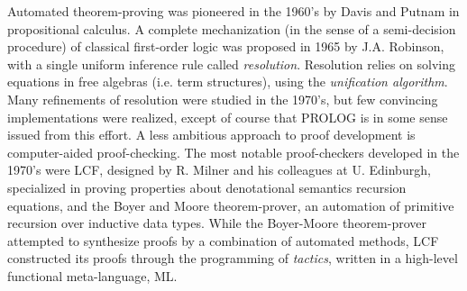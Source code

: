 Automated theorem-proving was pioneered in the 1960's by Davis and
Putnam in propositional calculus.  A complete mechanization (in the
sense of a semi-decision procedure) of classical first-order logic was
proposed in 1965 by J.A. Robinson, with a single uniform inference
rule called \emph{resolution}. Resolution relies on solving equations
in free algebras (i.e. term structures), using the \emph{unification
  algorithm}. Many refinements of resolution were studied in the
1970's, but few convincing implementations were realized, except of
course that PROLOG is in some sense issued from this effort.  A less
ambitious approach to proof development is computer-aided
proof-checking.  The most notable proof-checkers developed in the
1970's were LCF, designed by R. Milner and his colleagues at U.
Edinburgh, specialized in proving properties about denotational
semantics recursion equations, and the Boyer and Moore theorem-prover,
an automation of primitive recursion over inductive data types. While
the Boyer-Moore theorem-prover attempted to synthesize proofs by a
combination of automated methods, LCF constructed its proofs through
the programming of \emph{tactics}, written in a high-level functional
meta-language, ML.

